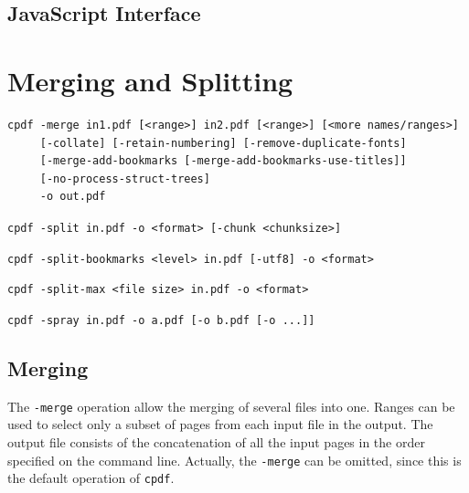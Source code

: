 \documentclass{book}
\newcommand{\cpdf}{\texttt{cpdf}}
\begin{document}
\begin{jscpdflib}
\clearpage
\section*{JavaScript Interface}
\begin{small}\tt




\end{small}
\end{jscpdflib}

\chapter{Merging and Splitting}\label{chap:2}
  \begin{framed}
  \small
  \noindent\begin{verbatim}
cpdf -merge in1.pdf [<range>] in2.pdf [<range>] [<more names/ranges>]
     [-collate] [-retain-numbering] [-remove-duplicate-fonts]
     [-merge-add-bookmarks [-merge-add-bookmarks-use-titles]]
     [-no-process-struct-trees]
     -o out.pdf\end{verbatim}

  \vspace{1.5mm}
  \noindent\verb!cpdf -split in.pdf -o <format> [-chunk <chunksize>]!

  \vspace{1.5mm}
  \noindent\verb!cpdf -split-bookmarks <level> in.pdf [-utf8] -o <format>!

  \vspace{1.5mm}
  \noindent\verb!cpdf -split-max <file size> in.pdf -o <format>!

  \vspace{1.5mm}
  \noindent\verb!cpdf -spray in.pdf -o a.pdf [-o b.pdf [-o ...]]!
  \end{framed}

  \vspace{12mm}
  \section{Merging}
  The \texttt{-merge} operation allow the merging of several files into one.
Ranges can be used to select only a subset of pages from each
input file in the output. The output file consists of the concatenation of all
the input pages in the order specified on the command line. Actually, the
\texttt{-merge} can be omitted, since this is the default operation of \cpdf.
\end{document}

